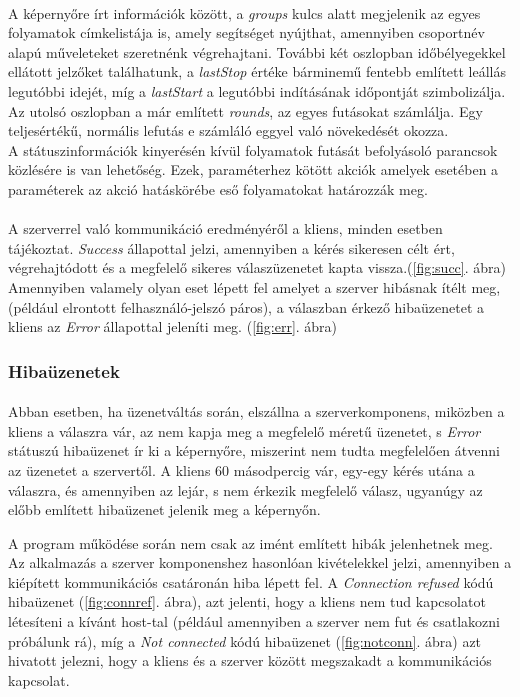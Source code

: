 \documentclass[12pt]{report}
\begin{document}
  \paragraph{}
  A képernyőre írt információk között, a \textit{groups} kulcs alatt megjelenik az egyes folyamatok címkelistája is, amely segítséget nyújthat, amennyiben csoportnév alapú műveleteket szeretnénk végrehajtani. 
  További két oszlopban időbélyegekkel ellátott jelzőket találhatunk, a \textit{lastStop} értéke bárminemű fentebb említett leállás legutóbbi idejét, míg a \textit{lastStart} a legutóbbi indításának időpontját szimbolizálja.
  Az utolsó oszlopban a már említett \textit{rounds}, az egyes futásokat számlálja. Egy teljesértékű, normális lefutás e számláló eggyel való növekedését okozza.
 \\
 A státuszinformációk kinyerésén kívül folyamatok futását befolyásoló parancsok közlésére is van lehetőség. Ezek, paraméterhez kötött akciók amelyek esetében a paraméterek az akció hatáskörébe eső folyamatokat határozzák meg.
 \paragraph{}
 A szerverrel való kommunikáció eredményéről a kliens, minden esetben tájékoztat. \textit{Success} állapottal jelzi, amennyiben a kérés sikeresen célt ért, végrehajtódott és a megfelelő sikeres válaszüzenetet kapta vissza.(\ref{fig:succ}. ábra) 
Amennyiben valamely olyan eset lépett fel amelyet a szerver hibásnak ítélt meg, (például elrontott felhasználó-jelszó páros), a válaszban érkező hibaüzenetet a kliens az \textit{Error} állapottal jeleníti meg. (\ref{fig:err}. ábra)
  
  \subsubsection{Hibaüzenetek}
  \paragraph{}
 Abban esetben, ha üzenetváltás során, elszállna a szerverkomponens, miközben a kliens a válaszra vár, az nem kapja meg a megfelelő méretű üzenetet, s \textit{Error} státuszú hibaüzenet ír ki a képernyőre, miszerint nem tudta megfelelően átvenni az üzenetet a szervertől. A kliens 60 másodpercig vár, egy-egy kérés utána a válaszra, és amennyiben az lejár, s nem érkezik megfelelő válasz, ugyanúgy az előbb említett hibaüzenet jelenik meg a képernyőn. 
 
  A program működése során nem csak az imént említett hibák jelenhetnek meg. Az alkalmazás a szerver komponenshez hasonlóan kivételekkel jelzi, amennyiben a kiépített kommunikációs csatáronán hiba lépett fel. 
  A \textit{Connection refused} kódú hibaüzenet (\ref{fig:connref}. ábra), azt jelenti, hogy a kliens nem tud kapcsolatot létesíteni a kívánt host-tal (például amennyiben a szerver nem fut és csatlakozni próbálunk rá), míg a \textit{Not connected} kódú hibaüzenet (\ref{fig:notconn}. ábra) azt hivatott jelezni, hogy a kliens és a szerver között megszakadt a kommunikációs kapcsolat.
  
\end{document}
